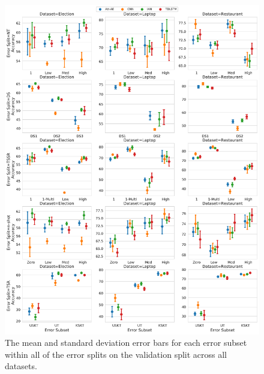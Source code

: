\begin{figure}[h!]
    \centering
    \includegraphics[scale=0.42]{images/augmentation/methods_performance/baseline/validation_error_subsets.pdf}
    \caption{The mean and standard deviation error bars for each error subset within all of the error splits on the validation split across all datasets.}
    \label{fig:aug_baseline_validation_error_subset}
\end{figure}

